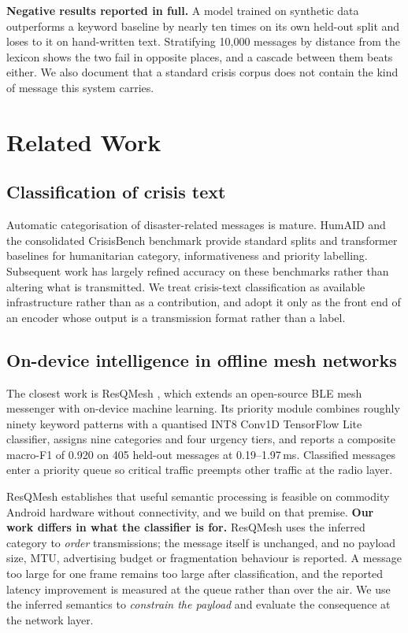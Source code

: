 \documentclass[conference]{IEEEtran}
\begin{document}
\textbf{Negative results reported in full.} A model trained on synthetic data
outperforms a keyword baseline by nearly ten times on its own held-out split
and loses to it on hand-written text. Stratifying 10{,}000 messages by distance
from the lexicon shows the two fail in opposite places, and a cascade between
them beats either. We also document that a standard crisis corpus does not
contain the kind of message this system carries.

\section{Related Work}

\subsection{Classification of crisis text}
Automatic categorisation of disaster-related messages is mature. HumAID
\cite{humaid} and the consolidated CrisisBench benchmark \cite{crisisbench}
provide standard splits and transformer baselines for humanitarian category,
informativeness and priority labelling. Subsequent work has largely refined
accuracy on these benchmarks rather than altering what is transmitted. We treat
crisis-text classification as available infrastructure rather than as a
contribution, and adopt it only as the front end of an encoder whose output is
a transmission format rather than a label.

\subsection{On-device intelligence in offline mesh networks}
The closest work is ResQMesh \cite{resqmesh}, which extends an open-source BLE
mesh messenger with on-device machine learning. Its priority module combines
roughly ninety keyword patterns with a quantised INT8 Conv1D TensorFlow Lite
classifier, assigns nine categories and four urgency tiers, and reports a
composite macro-F1 of 0.920 on 405 held-out messages at 0.19--1.97\,ms.
Classified messages enter a priority queue so critical traffic preempts other
traffic at the radio layer.

ResQMesh establishes that useful semantic processing is feasible on commodity
Android hardware without connectivity, and we build on that premise.
\textbf{Our work differs in what the classifier is for.} ResQMesh uses the
inferred category to \emph{order} transmissions; the message itself is
unchanged, and no payload size, MTU, advertising budget or fragmentation
behaviour is reported. A message too large for one frame remains too large
after classification, and the reported latency improvement is measured at the
queue rather than over the air. We use the inferred semantics to
\emph{constrain the payload} and evaluate the consequence at the network layer.
\end{document}
